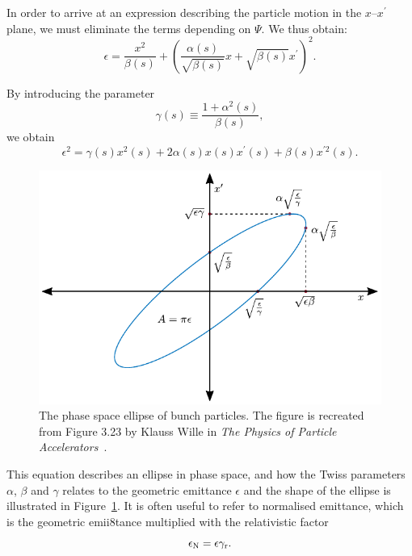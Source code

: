 In order to arrive at an expression describing the particle motion in the $x$--$x^\prime$ plane, we must eliminate the terms depending on $\Psi$.
We thus obtain:
\begin{equation}
    \epsilon = \frac{x^2}{\beta(s)} + \left(\frac{\alpha(s)}{\sqrt{\beta(s)}}x + \sqrt{\beta(s)}x^{\prime}\right)^2.
\end{equation}

By introducing the parameter
\begin{equation}
    \gamma(s) \equiv \frac{1+\alpha^2(s)}{\beta(s)}, \label{EQ:TwissGamma}
\end{equation}
we obtain
\begin{equation}
    \epsilon^2 = \gamma(s)x^2(s) + 2\alpha(s)x(s)x^{\prime}(s) + \beta(s)x^{\prime 2}(s). \label{EQ:EmittFull}
\end{equation}

\begin{figure}[hbt]
    \centering
    \includegraphics[width=0.8\linewidth]{figures/Twiss}
    \caption{\label{Fig:BPI:Twiss} The phase space ellipse of bunch particles.
    The figure is recreated from Figure 3.23 by Klauss Wille in \textit{The Physics of Particle Accelerators}~\cite{wille:2001}.}
\end{figure}

This equation describes an ellipse in phase space, and how the Twiss parameters $\alpha$, $\beta$ and $\gamma$ relates to the geometric emittance $\epsilon$ and the shape of the ellipse is illustrated in Figure~\ref{Fig:BPI:Twiss}.
It is often useful to refer to normalised emittance, which is the geometric emii8tance multiplied with the relativistic factor
\begin{equation}
    \epsilon_{\mathrm{N}} = \epsilon \gamma_{\mathrm{r}}.
\end{equation}

